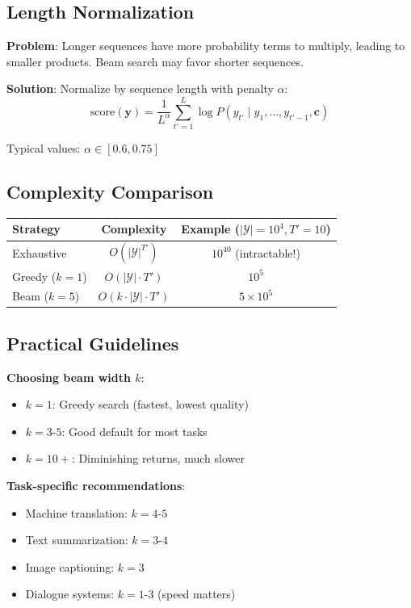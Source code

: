 \documentclass{article}
\begin{document}
\subsection{Length Normalization}

\textbf{Problem}: Longer sequences have more probability terms to multiply, leading to smaller products. Beam search may favor shorter sequences.

\textbf{Solution}: Normalize by sequence length with penalty $\alpha$:
\[
\text{score}(\mathbf{y}) = \frac{1}{L^\alpha} \sum_{t'=1}^{L} \log P(y_{t'} \mid y_1, \ldots, y_{t'-1}, \mathbf{c})
\]

Typical values: $\alpha \in [0.6, 0.75]$

\subsection{Complexity Comparison}

\begin{center}
\begin{tabular}{|l|c|c|}
\hline
\textbf{Strategy} & \textbf{Complexity} & \textbf{Example} ($|\mathcal{Y}|=10^4, T'=10$) \\
\hline
Exhaustive & $O(|\mathcal{Y}|^{T'})$ & $10^{40}$ (intractable!) \\
Greedy ($k=1$) & $O(|\mathcal{Y}| \cdot T')$ & $10^5$ \\
Beam ($k=5$) & $O(k \cdot |\mathcal{Y}| \cdot T')$ & $5 \times 10^5$ \\
\hline
\end{tabular}
\end{center}

\subsection{Practical Guidelines}

\textbf{Choosing beam width $k$}:
\begin{itemize}
\item $k=1$: Greedy search (fastest, lowest quality)
\item $k=3$-$5$: Good default for most tasks
\item $k=10+$: Diminishing returns, much slower
\end{itemize}

\textbf{Task-specific recommendations}:
\begin{itemize}
\item Machine translation: $k=4$-$5$
\item Text summarization: $k=3$-$4$
\item Image captioning: $k=3$
\item Dialogue systems: $k=1$-$3$ (speed matters)
\end{itemize}
\end{document}
